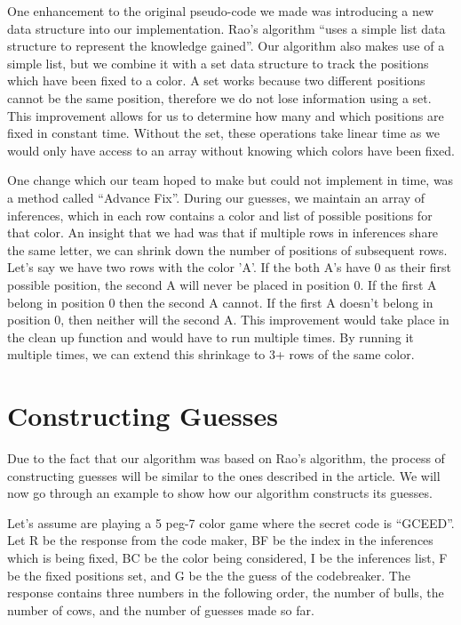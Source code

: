 \documentclass[11pt]{article}
\begin{document}
    One enhancement to the original pseudo-code we made was introducing a new data structure into our implementation. Rao's algorithm \enquote{uses a simple list data structure to represent the knowledge gained}\autocite{rao}. Our algorithm also makes use of a simple list, but we combine it with a set data structure to track the positions which have been fixed to a color. A set works because two different positions cannot be the same position, therefore we do not lose information using a set. This improvement allows for us to determine how many and which positions are fixed in constant time. Without the set, these operations take linear time as we would only have access to an array without knowing which colors have been fixed. 
    
    One change which our team hoped to make but could not implement in time, was a method called \enquote{Advance Fix}. During our guesses, we maintain an array of inferences, which in each row contains a color and list of possible positions for that color. An insight that we had was that if multiple rows in inferences share the same letter, we can shrink down the number of positions of subsequent rows. Let's say we have two rows with the color 'A'. If the both A's have 0 as their first possible position, the second A will never be placed in position 0. If the first A belong in position 0 then the second A cannot. If the first A doesn't belong in position 0, then neither will the second A. This improvement would take place in the clean up function and would have to run multiple times. By running it multiple times, we can extend this shrinkage to 3+ rows of the same color.

    \section{Constructing Guesses}
    Due to the fact that our algorithm was based on Rao's algorithm, the process of constructing guesses will be similar to the ones described in the article\autocite{rao}. We will now go through an example to show how our algorithm constructs its guesses.

    Let's assume are playing a 5 peg-7 color game where the secret code is \enquote{GCEED}. Let R be the response from the code maker, BF be the index in the inferences which is being fixed, BC be the color being considered, I be the inferences list, F be the fixed positions set, and G be the the guess of the codebreaker. The response contains three numbers in the following order, the number of bulls, the number of cows, and the number of guesses made so far.\\
\end{document}
